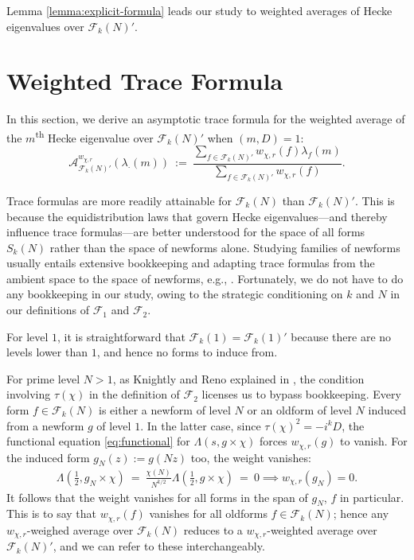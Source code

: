 \documentclass[12pt, reqno,oneside]{amsart}
\theoremstyle{plain}
\theoremstyle{definition}
\theoremstyle{remark}
\theoremstyle{plain}
\numberwithin{equation}{section}
\begin{document}
Lemma \ref{lemma:explicit-formula} leads our study to weighted averages of Hecke eigenvalues over $\mathcal{F}_k(N)'$.

%
%

\section{Weighted Trace Formula}\label{sec:4}

In this section, we derive an asymptotic trace formula for the weighted average of the $m$\textsuperscript{th} Hecke eigenvalue over $\mathcal{F}_k(N)'$ when $(m,D)=1$: 
\begin{equation}\label{eq:average-Hecke}
\mathcal{A}^{w_{\chi,r}}_{\mathcal{F}_k(N)'}(\lambda_\cdot(m)) \ := \ \frac{\sum_{f\in\mathcal{F}_k(N)'}w_{\chi,r}(f)\lambda_f(m)}{\sum_{f\in\mathcal{F}_k(N)'}w_{\chi,r}(f)}.
\end{equation}

Trace formulas are more readily attainable for $\mathcal{F}_k(N)$ than $\mathcal{F}_k(N)'$. This is because the equidistribution laws that govern Hecke eigenvalues---and thereby influence trace formulas---are better understood for the space of all forms $S_k(N)$ rather than the space of newforms alone. Studying families of newforms usually entails extensive bookkeeping and adapting trace formulas from the ambient space to the space of newforms, e.g., \cite[Propositions 2.1-2.8]{ILS00}. Fortunately, we do not have to do any bookkeeping in our study, owing to the strategic conditioning on $k$ and $N$ in our definitions of $\mathcal{F}_1$ and $\mathcal{F}_2$.

For level $1$, it is straightforward that $\mathcal{F}_k(1)=\mathcal{F}_k(1)'$ because there are no levels lower than $1$, and hence no forms to induce from. 

For prime level $N>1$, as Knightly and Reno explained in \cite[Section 4]{KR18}, the condition involving $\tau(\chi)$ in the definition of $\mathcal{F}_2$ licenses us to bypass bookkeeping. Every form $f\in\mathcal{F}_k(N)$ is either a newform of level $N$ or an oldform of level $N$ induced from a newform $g$ of level $1$. In the latter case, since $\tau(\chi)^2=-i^k D$, the functional equation \eqref{eq:functional} for $\Lambda(s,g\times\chi)$ forces $w_{\chi,r}(g)$ to vanish. For the induced form $g_N(z):=g(Nz)$ too, the weight vanishes:
\begin{align}
    \Lambda\left(\frac{1}{2},g_N\times\chi\right) \ = \ \frac{\chi(N)}{N^{k/2}}\Lambda\left(\frac{1}{2},g\times\chi\right) \ = \ 0 
    \implies w_{\chi,r}(g_N)=0.
\end{align}
It follows that the weight vanishes for all forms in the span of $g_N$, $f$ in particular. This is to say that $w_{\chi,r}(f)$ vanishes for all oldforms $f\in\mathcal{F}_k(N)$; hence any $w_{\chi,r}$-weighed average over $\mathcal{F}_k(N)$ reduces to a $w_{\chi,r}$-weighted average over $\mathcal{F}_k(N)'$, and we can refer to these interchangeably.
\end{document}
